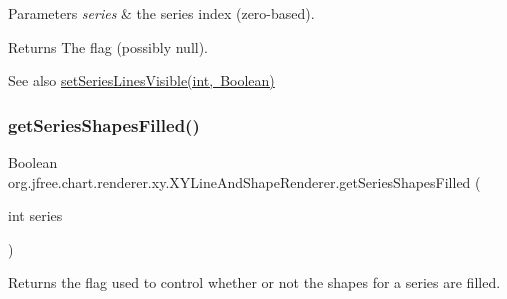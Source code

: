 \begin{DoxyParams}{Parameters}
{\em series} & the series index (zero-\/based).\\
\hline
\end{DoxyParams}
\begin{DoxyReturn}{Returns}
The flag (possibly {\ttfamily null}).
\end{DoxyReturn}
\begin{DoxySeeAlso}{See also}
\mbox{\hyperlink{classorg_1_1jfree_1_1chart_1_1renderer_1_1xy_1_1_x_y_line_and_shape_renderer_a3e09e10111a246bb357322764827c6bb}{set\+Series\+Lines\+Visible(int, Boolean)}} 
\end{DoxySeeAlso}
\mbox{\label{classorg_1_1jfree_1_1chart_1_1renderer_1_1xy_1_1_x_y_line_and_shape_renderer_a8700a7f72b4dfbcdb1e2a7979a7a0840}} 
\subsubsection{\texorpdfstring{get\+Series\+Shapes\+Filled()}{getSeriesShapesFilled()}}
{\footnotesize\ttfamily Boolean org.\+jfree.\+chart.\+renderer.\+xy.\+X\+Y\+Line\+And\+Shape\+Renderer.\+get\+Series\+Shapes\+Filled (\begin{DoxyParamCaption}\item[{int}]{series }\end{DoxyParamCaption})}

Returns the flag used to control whether or not the shapes for a series are filled.


